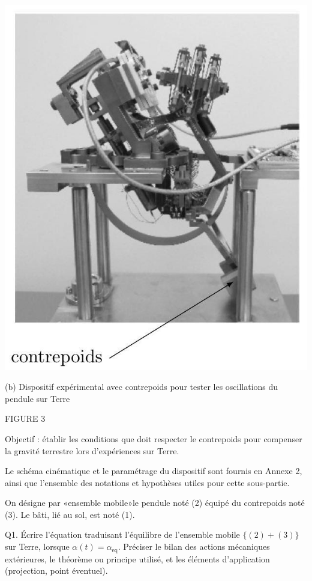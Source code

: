 \documentclass[10pt]{article}
\begin{document}
\begin{center}
\includegraphics[max width=\textwidth]{2024_04_26_3285cfc264024262add0g-04(1)}
\end{center}

(b) Dispositif expérimental avec contrepoids pour tester les oscillations du pendule sur Terre

FIGURE 3

Objectif : établir les conditions que doit respecter le contrepoids pour compenser la gravité terrestre lors d'expériences sur Terre.

Le schéma cinématique et le paramétrage du dispositif sont fournis en Annexe 2, ainsi que l'ensemble des notations et hypothèses utiles pour cette sous-partie.

On désigne par «ensemble mobile»le pendule noté (2) équipé du contrepoids noté (3). Le bâti, lié au sol, est noté (1).

Q1. Écrire l'équation traduisant l'équilibre de l'ensemble mobile $\{(2)+(3)\}$ sur Terre, lorsque $\alpha(t)=\alpha_{\mathrm{eq}}$. Préciser le bilan des actions mécaniques extérieures, le théorème ou principe utilisé, et les éléments d'application (projection, point éventuel).
\end{document}

